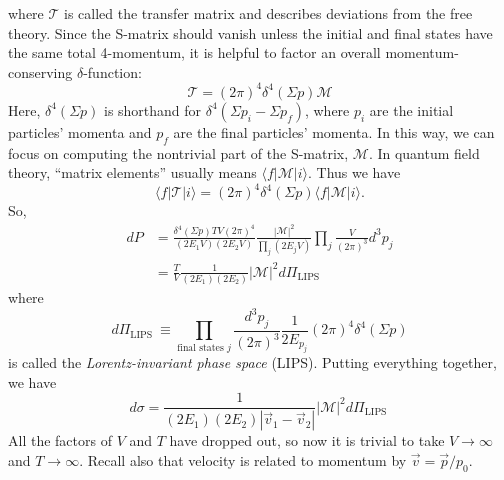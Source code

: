 where $\mathcal{T}$ is called the transfer matrix and describes deviations from the free theory. 
Since the S-matrix should vanish unless the initial and final states have the same total 4-momentum, it is helpful to factor an overall momentum-conserving $\delta$-function:
\begin{equation}
	\mathcal{T}=(2 \pi)^{4} \delta^{4}(\Sigma p) \mathcal{M}
\end{equation}
Here, $\delta^{4}(\Sigma p)$ is shorthand for $\delta^{4}\left(\Sigma p_{i}-\Sigma p_{f}\right)$, where $p_{i}$ are the initial particles' momenta and $p_{f}$ are the final particles' momenta. 
In this way, we can focus on computing the nontrivial part of the S-matrix, $\mathcal{M}$. 
In quantum field theory, ``matrix elements'' usually means $\langle f|\mathcal{M}| i\rangle$. Thus we have
\begin{equation}
	\langle f|\mathcal T| i\rangle=(2 \pi)^{4} \delta^{4}(\Sigma p)\langle f|\mathcal{M}| i\rangle.
\end{equation}
So,
\begin{equation}
\begin{aligned}
	d P &=\frac{\delta^{4}(\Sigma p) T V(2 \pi)^{4}}{\left(2 E_{1} V\right)\left(2 E_{2} V\right)} \frac{|\mathcal{M}|^{2}}{\prod_{j}\left(2 E_{j} V\right)} \prod_{j} \frac{V}{(2 \pi)^{3}} d^{3} p_{j} \\
	&=\frac{T}{V} \frac{1}{\left(2 E_{1}\right)\left(2 E_{2}\right)}|\mathcal{M}|^{2} d \Pi_{\mathrm{LIPS}}
\end{aligned}
\end{equation}
where
\begin{equation}
	d \Pi_{\text {LIPS }} \equiv \prod_{\text {final states } j} \frac{d^{3} p_{j}}{(2 \pi)^{3}} \frac{1}{2 E_{p_{j}}}(2 \pi)^{4} \delta^{4}(\Sigma p)
\end{equation}
is called the \textit{Lorentz-invariant phase space} (LIPS).
Putting everything together, we have
\begin{equation}
	d \sigma=\frac{1}{\left(2 E_{1}\right)\left(2 E_{2}\right)\left|\vec{v}_{1}-\vec{v}_{2}\right|}|\mathcal{M}|^{2} d \Pi_{\text {LIPS }}
\end{equation}
All the factors of $V$ and $T$ have dropped out, so now it is trivial to take $V \rightarrow \infty$ and $T \rightarrow \infty$. Recall also that velocity is related to momentum by $\vec{v}=\vec{p} / p_{0}$.


